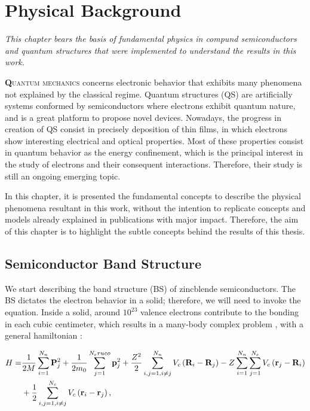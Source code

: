 \chapter{Physical Background }
\label{chap:Chapter-1}
\textit{This chapter bears the basis of fundamental physics in compund semiconductors and
quantum structures that were implemented to understand the results in this work.}
\vfill
\minitoc
\newpage

\lettrine[lines=3, lraise=.1, nindent=0mm, slope=0mm]{\textbf{Q}}{uantum mechanics}  concerns electronic behavior that exhibits many phenomena not explained by the classical regime. Quantum structures (QS) are artificially systems conformed by semiconductors where electrons exhibit quantum nature, and is a great platform to propose novel devices. Nowadays, the progress in creation of QS consist in precisely deposition of thin films, in which electrons show interesting electrical and optical properties\cite{sundram1991structures}. Most of these properties consist in quantum behavior  as the energy confinement, which is the principal interest in the study of electrons and their consequent interactions. Therefore,  their study is still an ongoing emerging topic. 

In this chapter, it is presented the fundamental concepts to describe the physical  phenomena resultant in this work, without the intention to replicate concepts and models already explained in publications with major impact. Therefore, the aim of  this chapter is to highlight the subtle concepts behind the results of this thesis.

\section{Semiconductor Band Structure}
\label{sec:chapter-1-semiconductor}
\vspace{-10mm}
We start describing the band structure (\gls{BS}) of zincblende semiconductors. The \gls{BS} dictates the electron behavior in a solid; therefore, we will need to invoke the \sch equation. Inside a solid, around $10^{23}$ valence electrons contribute to the bonding in each cubic centimeter,  which results in a many-body complex problem \cite{piprek2017handbook}, with a general hamiltonian \cite{alloul2010introduction,cardona2005fundamentals}: 

\begin{equation}
\begin{split}
	H  =  &\dfrac{1}{2M}\sum\limits_{i=1}^{N_{n}} \mathrm{\bf P}_{j}^{2} + \dfrac{1}{2m_{0}} \sum\limits_{j=1}^{N_{e}
	ruco} \mathrm{\bf p}_{j}^{2} + \dfrac{Z^{2}}{2} \sum\limits_{i,j=1,i\neq j}^{N_{n}} V_{c}\left(\mathrm{\bf R}_{i}-\mathrm{\bf R}_{j}\right)-Z\sum\limits_{i=1}^{N_{n}}\sum\limits_{j=1}^{N_{e}}V_{c}\left(\mathrm{\bf r}_{j}-\mathrm{\bf R}_{i}\right) \\
	   & + \dfrac{1}{2} \sum\limits_{i,j=1,i\neq j}^{N_{e}} V_{c} \left(\mathrm{\bf r}_{i}-\mathrm{\bf r}_{j}\right),
\end{split}
\label{eq:chapter-1-solid-hamiltonian}
\end{equation}

